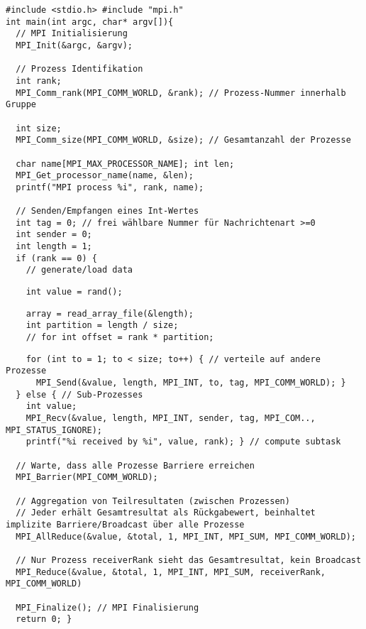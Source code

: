 \begin{lstlisting}
#include <stdio.h> #include "mpi.h"
int main(int argc, char* argv[]){
  // MPI Initialisierung
  MPI_Init(&argc, &argv);

  // Prozess Identifikation
  int rank;
  MPI_Comm_rank(MPI_COMM_WORLD, &rank); // Prozess-Nummer innerhalb Gruppe

  int size;
  MPI_Comm_size(MPI_COMM_WORLD, &size); // Gesamtanzahl der Prozesse

  char name[MPI_MAX_PROCESSOR_NAME]; int len;
  MPI_Get_processor_name(name, &len);
  printf("MPI process %i", rank, name);

  // Senden/Empfangen eines Int-Wertes
  int tag = 0; // frei wählbare Nummer für Nachrichtenart >=0
  int sender = 0;
  int length = 1;
  if (rank == 0) {
    // generate/load data
\end{lstlisting}
\begin{minipage}[t]{0.5\linewidth}
    \begin{lstlisting}
    int value = rand();
    \end{lstlisting}
\end{minipage}
\begin{minipage}[t]{0.5\linewidth}
    \begin{lstlisting}
    array = read_array_file(&length);
    int partition = length / size;
    // for int offset = rank * partition;
    \end{lstlisting}
\end{minipage}
\begin{lstlisting}
    for (int to = 1; to < size; to++) { // verteile auf andere Prozesse
      MPI_Send(&value, length, MPI_INT, to, tag, MPI_COMM_WORLD); }
  } else { // Sub-Prozesses
    int value;
    MPI_Recv(&value, length, MPI_INT, sender, tag, MPI_COM.., MPI_STATUS_IGNORE);
    printf("%i received by %i", value, rank); } // compute subtask

  // Warte, dass alle Prozesse Barriere erreichen
  MPI_Barrier(MPI_COMM_WORLD);

  // Aggregation von Teilresultaten (zwischen Prozessen)
  // Jeder erhält Gesamtresultat als Rückgabewert, beinhaltet implizite Barriere/Broadcast über alle Prozesse
  MPI_AllReduce(&value, &total, 1, MPI_INT, MPI_SUM, MPI_COMM_WORLD);

  // Nur Prozess receiverRank sieht das Gesamtresultat, kein Broadcast
  MPI_Reduce(&value, &total, 1, MPI_INT, MPI_SUM, receiverRank, MPI_COMM_WORLD)

  MPI_Finalize(); // MPI Finalisierung
  return 0; }
\end{lstlisting}

